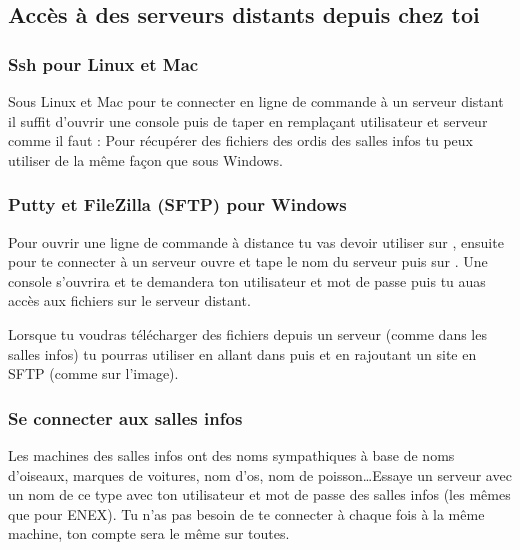 \subsection{Acc\`es \`a des serveurs distants depuis chez toi}

\subsubsection{Ssh pour Linux et Mac}

Sous Linux et Mac pour te connecter en ligne de commande à un serveur distant il suffit d'ouvrir une console puis de taper en remplaçant utilisateur et serveur comme il faut :  Pour récupérer des fichiers des ordis des salles infos tu peux utiliser  de la même façon que sous Windows.

\subsubsection{Putty et FileZilla (SFTP) pour Windows}

Pour ouvrir une ligne de commande à distance tu vas devoir utiliser  sur , ensuite pour te connecter à un serveur ouvre  et tape le nom du serveur puis sur . Une console s'ouvrira et te demandera ton utilisateur et mot de passe puis tu auas accès aux fichiers sur le serveur distant.


Lorsque tu voudras télécharger des fichiers depuis un serveur (comme dans les salles infos) tu pourras utiliser  en allant dans  puis  et en rajoutant un site en SFTP (comme sur l'image).


\subsubsection{Se connecter aux salles infos}

Les machines des salles infos ont des noms sympathiques à base de noms d'oiseaux, marques de voitures, nom d'os, nom de poisson\dots Essaye un serveur avec un nom de ce type avec ton utilisateur et mot de passe des salles infos (les mêmes que pour ENEX). Tu n'as pas besoin de te connecter à chaque fois à la même machine, ton compte sera le même sur toutes. 

